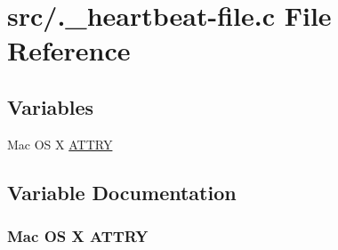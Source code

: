 \hypertarget{_8__heartbeat-file_8c}{
\section{src/.\_\-heartbeat-file.c File Reference}
\label{_8__heartbeat-file_8c}
}
\subsection*{Variables}
\begin{CompactItemize}
\item 
Mac OS X \hyperlink{_8__heartbeat-file_8c_5061a8b42c1273d5dac6ba84a12ccd49}{ATTRY}
\end{CompactItemize}


\subsection{Variable Documentation}
\hypertarget{_8__heartbeat-file_8c_5061a8b42c1273d5dac6ba84a12ccd49}{
\subsubsection[ATTRY]{\setlength{\rightskip}{0pt plus 5cm}Mac OS X {\bf ATTRY}}}
\label{_8__heartbeat-file_8c_5061a8b42c1273d5dac6ba84a12ccd49}


